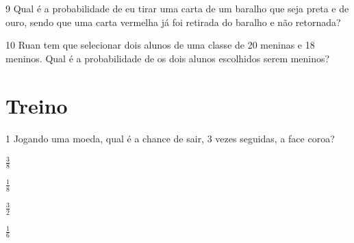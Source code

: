 \num{9} Qual é a probabilidade de eu tirar uma carta de um baralho que seja
preta e de ouro, sendo que uma carta vermelha já foi retirada do baralho
e não retornada?


\num{10} Ruan tem que selecionar dois alunos de uma classe de 20 meninas e 18
meninos. Qual é a probabilidade de os dois alunos escolhidos serem
meninos?


\pagebreak

\section*{Treino}

\num{1} Jogando uma moeda, qual é a chance de sair, 3 vezes seguidas, a face
coroa?

\begin{escolha}[itemsep=0pt]
\item $\frac{3}{8}$
\item $\frac{1}{8}$
\item $\frac{3}{2}$
\item $\frac{1}{6}$
\end{escolha}



